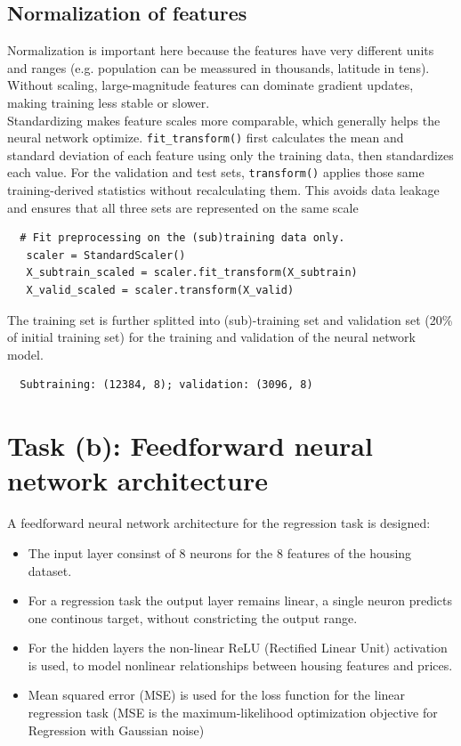 \documentclass[11pt,a4paper]{article}
\begin{document}
\subsection{Normalization of features}
\label{subsec:normfeat}

Normalization is important here because the features have very different units and ranges (e.g. population can be meassured in thousands, latitude in tens).
Without scaling, large-magnitude features can dominate gradient updates, making training less stable or slower. 
\vspace{1em}
\\Standardizing makes feature scales more comparable, which generally helps the neural network optimize.
\noindent \texttt{fit\_transform()} first calculates the mean and standard deviation of each feature using only the training data, 
then standardizes each value. For the validation and test sets, \texttt{transform()} applies those 
same training-derived statistics without recalculating them. This avoids data leakage and ensures that all three sets are represented on the same scale

\begin{lstlisting}
  # Fit preprocessing on the (sub)training data only.
   scaler = StandardScaler()
   X_subtrain_scaled = scaler.fit_transform(X_subtrain)
   X_valid_scaled = scaler.transform(X_valid)
\end{lstlisting}

\noindent The training set is further splitted into (sub)-training set and validation set (20\% of initial training set) for the training and validation of the neural network model.

\begin{lstlisting}
  Subtraining: (12384, 8); validation: (3096, 8)
\end{lstlisting}  

\clearpage
\section{Task (b): Feedforward neural network architecture}
\label{sec:feedforward}

\noindent A feedforward neural network architecture for the regression task is designed:
\begin{itemize}[nosep]
  \item The input layer consinst of 8 neurons for the 8 features of the housing dataset.
  \item For a regression task the output layer remains linear, a single neuron predicts one continous target, without constricting the output range.
  \item For the hidden layers the non-linear ReLU (Rectified Linear Unit) activation is used, to model nonlinear relationships between housing features and prices.
  \item Mean squared error (MSE) is used for the loss function for the linear regression task (MSE is the maximum-likelihood optimization objective for Regression with Gaussian noise)
\end{itemize}
\end{document}
